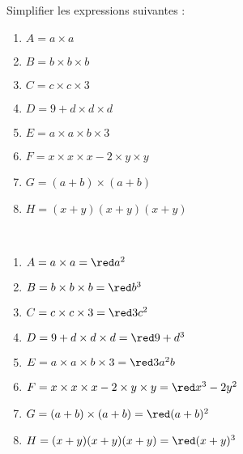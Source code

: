 \begin{exercice}
    Simplifier les expressions suivantes :
    \begin{enumerate}
       \item $A =a\times a$
       \item $B =b\times b\times b$
       \item $C =c\times c\times3$
       \item $D =9+d\times d\times d$
       \item $E =a\times a\times b\times3$
       \item $F =x\times x\times x-2\times y\times y$
       \item $G =(a+b)\times(a+b)$
       \item $H =(x+y)(x+y)(x+y)$
    \end{enumerate}
 \end{exercice}
 
 \begin{corrige}
    \ \\ [-5mm]
    \begin{enumerate}
       \item $A =a\times a =\red a^2$
       \item $B =b\times b\times b =\red b^3$
       \item $C =c\times c\times3 =\red3c^2$
       \item $D =9+d\times d\times d =\red9+d^3$
       \item $E =a\times a\times b\times3 =\red3a^2b$
       \item $F =x\times x\times x-2\times y\times y =\red x^3-2y^2$
       \item $G =(a+b)\times(a+b) =\red(a+b)^2$
       \item $H =(x+y)(x+y)(x+y) =\red(x+y)^3$ \medskip
    \end{enumerate}
 \end{corrige}